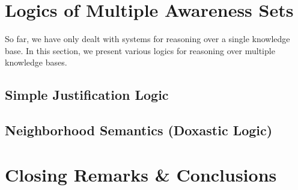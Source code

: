 \documentclass{article}
\begin{document}
\section{Logics of Multiple Awareness Sets}

So far, we have only dealt with systems for reasoning over a single knowledge
base.  In this section, we present various logics for reasoning over multiple
knowledge bases.

\subsection{Simple Justification Logic}
\label{simple_justification}


% 

\subsection{Neighborhood Semantics (Doxastic Logic)}
\label{neighborhood_semantics}


% 

\section{Closing Remarks \& Conclusions}
\label{conclusions}




\end{document}
